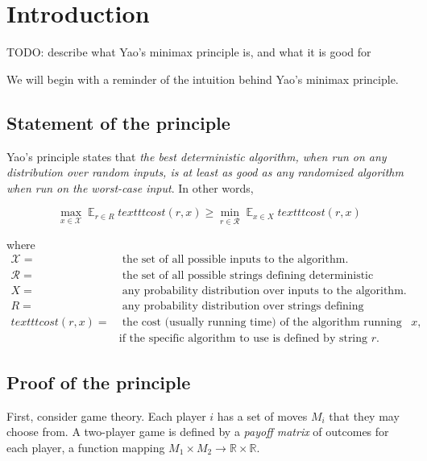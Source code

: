 \section{Introduction}

\newcommand{\Expected}{\mathop{\mathds{E}}}

TODO: describe what Yao's minimax principle is, and what it is good for

We will begin with a reminder of the intuition behind Yao's minimax principle.

\subsection{Statement of the principle}

Yao's principle states that \emph{the best deterministic algorithm, when run on any distribution over random inputs, is at least as good as any randomized algorithm when run on the worst-case input}. In other words,

$$\max_{x \in \mathcal{X}} \Expected_{r \in R} texttt{cost}(r, x) \geq \min_{r \in \mathcal{R}} \Expected_{x \in X} texttt{cost}(r, x)$$

where \begin{align*}
\mathcal{X} =&\; \text{the set of all possible inputs to the algorithm.}
\\
\mathcal{R} =&\; \text{the set of all possible strings defining deterministic algorithms.}
\\
X =&\; \text{any probability distribution over inputs to the algorithm.}
\\
R =&\; \text{any probability distribution over strings defining deterministic algorithms.}
\\
texttt{cost}(r, x) =&\; \text{the cost (usually running time) of the algorithm running on input $x$,}
          \\& \text{if the specific algorithm to use is defined by string $r$.}
\end{align*}

\subsection{Proof of the principle}

First, consider game theory. Each player $i$ has a set of moves $M_i$ that they may choose from. A two-player game is defined by a \emph{payoff matrix} of outcomes for each player, a function mapping $M_1 \times M_2 \rightarrow \mathds{R} \times \mathds{R}$.

